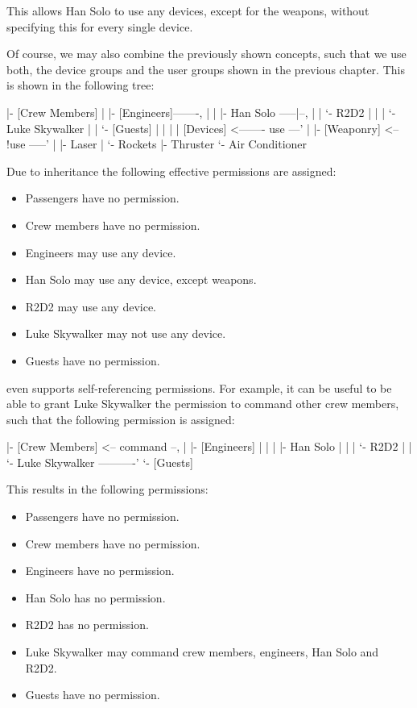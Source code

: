 This allows Han Solo to use any devices, except for the weapons, without 
specifying this for every single device.

Of course, we may also combine the previously shown concepts, such that we 
use both, the device groups and the user groups shown in the previous chapter.
This is shown in the following tree:

\begin{indentverb}
[Passengers]
  |- [Crew Members]
  |   |- [Engineers]-------,
  |   |   |- Han Solo -----|--,
  |   |   `- R2D2          |  |
  |   `- Luke Skywalker    |  |
  `- [Guests]              |  |
                           |  |
[Devices]  <------- use ---'  |
  |- [Weaponry] <-- !use -----'
  |   |- Laser
  |   `- Rockets
  |- Thruster
  `- Air Conditioner
\end{indentverb}

Due to inheritance the following effective permissions are assigned:

\begin{itemize}
\item Passengers have no permission.
\item Crew members have no permission.
\item Engineers may use any device.
\item Han Solo may use any device, except weapons.
\item R2D2 may use any device.
\item Luke Skywalker may not use any device.
\item Guests have no permission.
\end{itemize}

\product even supports self-referencing permissions. For example, it can 
be useful to be able to grant Luke Skywalker the permission to command 
other crew members, such that the following permission is assigned:

\begin{indentverb}
[Passengers]
  |- [Crew Members] <-- command --,
  |   |- [Engineers]              |
  |   |   |- Han Solo             |
  |   |   `- R2D2                 |
  |   `- Luke Skywalker ----------'
  `- [Guests]
\end{indentverb}

This results in the following permissions:

\begin{itemize}
\item Passengers have no permission.
\item Crew members have no permission.
\item Engineers have no permission.
\item Han Solo has no permission.
\item R2D2 has no permission.
\item Luke Skywalker may command crew members, engineers, Han Solo and R2D2.
\item Guests have no permission.
\end{itemize}


